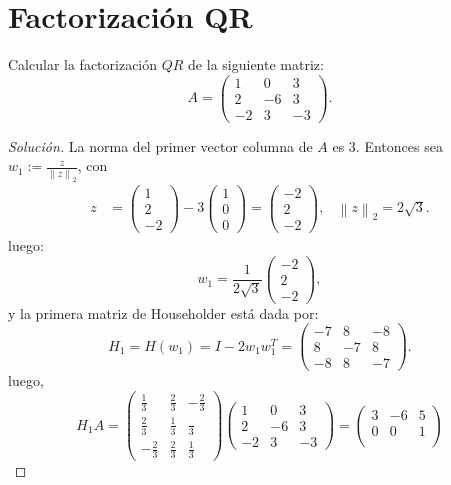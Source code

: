 \documentclass[12pt]{book}
\newcommand\norm[1]{\left\lVert#1\right\rVert}
\newenvironment{solucion}
  {\renewcommand\qedsymbol{$\square$}\begin{proof}[Solución]}
  {\end{proof}}
\begin{document}
\section{Factorización QR}
\eje Calcular la factorización $QR$ de la siguiente matriz:
\[A=\begin{pmatrix}
1&0&3\\
2&-6&3\\
-2&3&-3
\end{pmatrix}.\]
\begin{solucion}
La norma del primer vector columna de $A$ es 3. Entonces sea $w_1:=\frac{z}{\norm{z}_2}$, con
\begin{align*}
    z&=\begin{pmatrix}
    1\\
    2\\
    -2
    \end{pmatrix}-3\begin{pmatrix}
    1\\
    0\\
    0
    \end{pmatrix}=\begin{pmatrix}
    -2\\
    2\\
    -2
    \end{pmatrix}, & \norm{z}_2=2\sqrt{3}.
\end{align*}
luego:
\[w_1=\frac{1}{2\sqrt{3}}\begin{pmatrix}
-2\\
2\\
-2
\end{pmatrix},\]
y la primera matriz de Householder está dada por:
\[H_1=H(w_1)=I-2w_1w_1^T=\begin{pmatrix}
-7&8&-8\\
8&-7&8\\
-8&8&-7
\end{pmatrix}.\]
luego,
\[H_1A=\begin{pmatrix}
\frac{1}{3}&\frac{2}{3}&-\frac{2}{3}\\
\frac{2}{3}&\frac{1}{3}&\frac{}{3}\\
-\frac{2}{3}&\frac{2}{3}&\frac{1}{3}
\end{pmatrix}\begin{pmatrix}
1&0&3\\
2&-6&3\\
-2&3&-3
\end{pmatrix}=\begin{pmatrix}
3&-6&5\\
0&0&1\\

\end{pmatrix}\]
\end{solucion}
\end{document}
